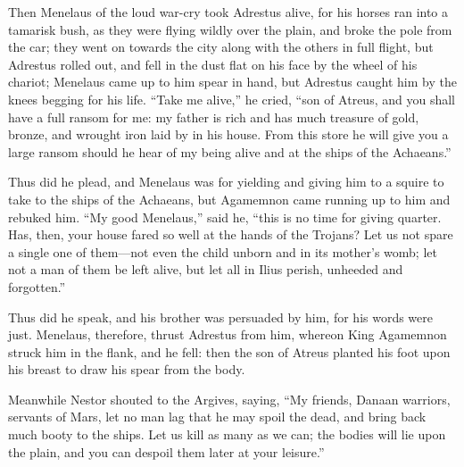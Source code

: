 Then Menelaus of the loud war-cry took Adrestus alive, for his horses ran
into a tamarisk bush, as they were flying wildly over the plain, and broke
the pole from the car; they went on towards the city along with the others
in full flight, but Adrestus rolled out, and fell in the dust flat on his
face by the wheel of his chariot; Menelaus came up to him spear in hand,
but Adrestus caught him by the knees begging for his life. “Take me
alive,” he cried, “son of Atreus, and you shall have a full ransom for me:
my father is rich and has much treasure of gold, bronze, and wrought iron
laid by in his house. From this store he will give you a large ransom
should he hear of my being alive and at the ships of the Achaeans.”

Thus did he plead, and Menelaus was for yielding and giving him to a
squire to take to the ships of the Achaeans, but Agamemnon came running up
to him and rebuked him. “My good Menelaus,” said he, “this is no time for
giving quarter. Has, then, your house fared so well at the hands of the
Trojans? Let us not spare a single one of them—not even the child
unborn and in its mother’s womb; let not a man of them be left alive, but
let all in Ilius perish, unheeded and forgotten.”

Thus did he speak, and his brother was persuaded by him, for his words
were just. Menelaus, therefore, thrust Adrestus from him, whereon King
Agamemnon struck him in the flank, and he fell: then the son of Atreus
planted his foot upon his breast to draw his spear from the body.

Meanwhile Nestor shouted to the Argives, saying, “My friends, Danaan
warriors, servants of Mars, let no man lag that he may spoil the dead, and
bring back much booty to the ships. Let us kill as many as we can; the
bodies will lie upon the plain, and you can despoil them later at your
leisure.”

